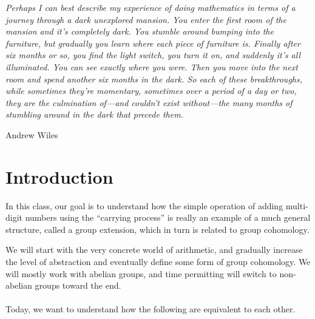 \cleardoublepage
{}
  \maketitle
\tableofcontents
$\: $
\vspace{1cm}
\newpage
\setlength{\epigraphwidth}{\textwidth}
\epigraph{\it Perhaps I can best describe my experience of doing mathematics in terms of a journey through a dark unexplored mansion. You enter the first room of the mansion and it’s completely dark. You stumble around bumping into the furniture, but gradually you learn where each piece of furniture is. Finally after six months or so, you find the light switch, you turn it on, and suddenly it’s all illuminated. You can see exactly where you were. Then you move into the next room and spend another six months in the dark. So each of these breakthroughs, while sometimes they’re momentary, sometimes over a period of a day or two, they are the culmination of—and couldn’t exist without—the many months of stumbling around in the dark that precede them.}{Andrew Wiles}
\vspace{2cm}

\section*{Introduction}
In this class, our goal is to understand how the simple operation of adding multi-digit numbers using the ``carrying process'' is really an example of a much general structure, called a group extension, which in turn is related to group cohomology.

We will start with the very concrete world of arithmetic, and gradually increase the level of abstraction and eventually define some form of group cohomology.
We will mostly work with abelian groups, and time permitting will switch to non-abelian groups toward the end.\\\\

Today, we want to understand how the following are equivalent to each other.
\begin{mdframed}
\end{mdframed}

\cleardoublepage
{}
